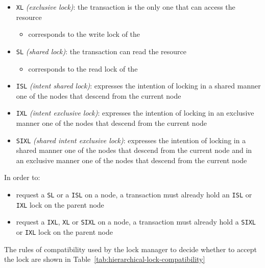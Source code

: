 \documentclass[english]{article}
\begin{document}
\begin{itemize}
  \item \texttt{XL} \textit{(exclusive lock)}: the transaction is the only one that can access the resource
        \begin{itemize}[label=\(\rightarrow\)]
          \item corresponds to the write lock of the \TPL
        \end{itemize}
  \item \texttt{SL} \textit{(shared lock)}: the transaction can read the resource
        \begin{itemize}[label=\(\rightarrow\)]
          \item corresponds to the read lock of the \TPL
        \end{itemize}
  \item \texttt{ISL} \textit{(intent shared lock)}: expresses the intention of locking in a shared manner one of the nodes that descend from the current node
  \item \texttt{IXL} \textit{(intent exclusive lock)}: expresses the intention of locking in an exclusive manner one of the nodes that descend from the current node
  \item \texttt{SIXL} \textit{(shared intent exclusive lock)}: expresses the intention of locking in a shared manner one of the nodes that descend from the current node and in an exclusive manner one of the nodes that descend from the current node
\end{itemize}

In order to:

\begin{itemize}
  \item request a \texttt{SL} or a \texttt{ISL} on a node, a transaction must already hold an \texttt{ISL} or \texttt{IXL} lock on the parent node
  \item request a \texttt{IXL}, \texttt{XL} or \texttt{SIXL} on a node, a transaction must already hold a \texttt{SIXL} or \texttt{IXL} lock on the parent node
\end{itemize}

\bigskip
The rules of compatibility used by the lock manager to decide whether to accept the lock are shown in Table~\ref{tab:hierarchical-lock-compatibility}
\end{document}
